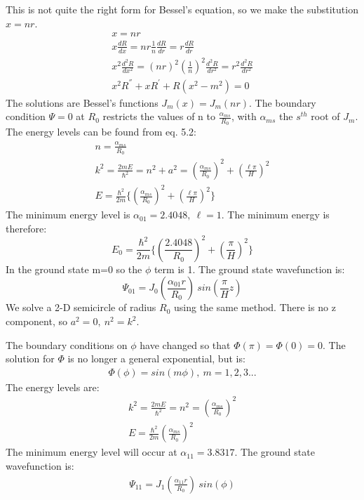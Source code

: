 \documentclass[a4paper,10pt]{article}
\numberwithin{equation}{section}
\begin{document}
This is not quite the right form for Bessel's equation, so we make the substitution $x=nr$.
\begin{gather}
 x=nr\\
 x\frac{dR}{dx}=nr\frac{1}{n}\frac{dR}{dr}=r\frac{dR}{dr}\\
 x^2\frac{d^2R}{dx^2}=(nr)^2(\frac{1}{n})^2\frac{d^2R}{dr^2}=r^2\frac{d^2R}{dr^2}\\
 x^2R^{''}+xR^{'}+R(x^2-m^2)=0
\end{gather}
The solutions are Bessel's functions $J_{m}(x)=J_{m}(nr)$. 
The boundary condition $\Psi=0$ at $R_0$ restricts the values of n to $\frac{\alpha_{ms}}{R_0}$, with $\alpha_{ms}$ the $s^{th}$ root of $J_{m}$. 
The energy levels can be found from eq. 5.2:
\begin{gather}
 n=\frac{\alpha_{ms}}{R_0}\\
 k^2=\frac{2mE}{\hbar ^2}=n^2+a^2=(\frac{\alpha_{ms}}{R_0})^2+(\frac{\ell \pi}{H})^2\\
 E=\frac{\hbar^2}{2m}\{(\frac{\alpha_{ms}}{R_0})^2+(\frac{\ell \pi}{H})^2 \}
\end{gather}
The minimum energy level is $\alpha_{01}=2.4048,\ \ell=1$. The minimum energy is therefore:
\begin{equation}
  E_0=\frac{\hbar^2}{2m}\{(\frac{2.4048}{R_0})^2+(\frac{\pi}{H})^2 \}
\end{equation}
In the ground state m=0 so the $\phi$ term is 1. The ground state wavefunction is:
\begin{equation}
 \Psi_{01}=J_0(\frac{\alpha_{01}r}{R_0})\ sin(\frac{\pi}{H} z)
\end{equation}
We solve a 2-D semicircle of radius $R_0$ using the same method. 
There is no z component, so $a^2=0, \ n^2=k^2$.

The boundary conditions on $\phi$ have changed so that $\Phi(\pi)=\Phi(0)=0$. 
The solution for $\Phi$ is no longer a general exponential, but is:
\begin{gather}
 \Phi(\phi)=sin(m \phi),\ m=1,2,3...
\end{gather}
The energy levels are:
\begin{gather}
 k^2=\frac{2mE}{\hbar ^2}=n^2=(\frac{\alpha_{ms}}{R_0})^2\\
 E=\frac{\hbar^2}{2m}(\frac{\alpha_{ms}}{R_0})^2
\end{gather}
The minimum energy level will occur at $\alpha_{11}=3.8317$. The ground state wavefunction is:
\begin{gather}
 \Psi_{11}=J_{1}(\frac{\alpha_{11} r}{R_0})\ sin(\phi)
\end{gather}
\end{document}
